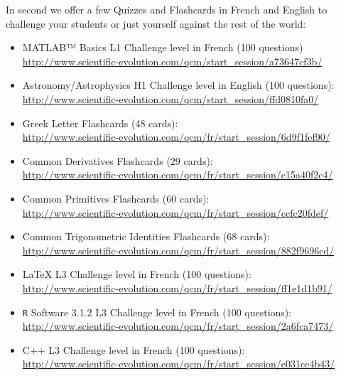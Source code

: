 	 In second we offer a few Quizzes and Flashcards in French and English to challenge your students or just yourself against the rest of the world:
	 \begin{itemize}
		\item MATLAB™ Basics L1 Challenge level in French (100 questions)\\ \url{http://www.scientific-evolution.com/qcm/start_session/a73647cf3b/}
		
		\item Astronomy/Astrophysics H1 Challenge level in English (100 questions):\\ \url{http://www.scientific-evolution.com/qcm/start_session/ffd0810fa0/}
		
		\item Greek Letter Flashcards (48 cards):\\
		\url{http://www.scientific-evolution.com/qcm/fr/start_session/6d9f1fef90/}
		
		\item Common Derivatives Flashcards (29 cards):\\
		\url{http://www.scientific-evolution.com/qcm/fr/start_session/c15a40f2c4/}
		
		\item Common Primitives Flashcards (60 cards):\\
		\url{http://www.scientific-evolution.com/qcm/fr/start_session/ccfc20fdef/}
		
		\item Common Trigonometric Identities Flashcards (68 cards):\\
		\url{http://www.scientific-evolution.com/qcm/fr/start_session/882f9696cd/}
		
		\item \LaTeX{} L3 Challenge level in French (100 questions):\\ \url{http://www.scientific-evolution.com/qcm/fr/start_session/ff1e1d1b91/}
		
		\item \texttt{R} Software 3.1.2 L3 Challenge level in French (100 questions):\\ \url{http://www.scientific-evolution.com/qcm/fr/start_session/2a6fca7473/}
		
		\item C++ L3 Challenge level in French (100 questions):\\
		\url{http://www.scientific-evolution.com/qcm/fr/start_session/e031ce4b43/}
	\end{itemize}
	
